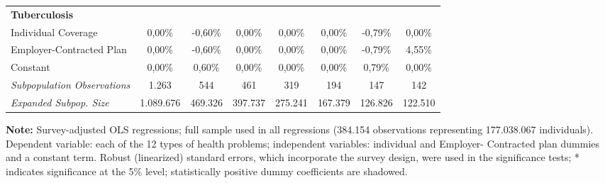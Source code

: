 \documentclass{article}
\begin{document}
\begin{table*}
{\begin{tabular}{l*{7}{c}}
\midrule
\textbf{Tuberculosis} & & & & & & & \\

Individual Coverage 	&   0,00\%         &  -0,60\%         &   0,00\%         &   0,00\%         &   0,00\%         &  -0,79\%         &   0,00\%         \\
Employer-Contracted Plan&   0,00\%         &  -0,60\%         &   0,00\%         &   0,00\%         &   0,00\%         &  -0,79\%         &   4,55\%         \\
Constant            	&   0,00\%         &   0,60\%         &   0,00\%         &   0,00\%         &   0,00\%         &   0,79\%         &   0,00\%         \\

\midrule

\textit{Subpopulation Observations} 	&  1.263 & 544 & 461 & 319 & 194 & 147 & 142         \\
\textit{Expanded Subpop. Size} 		&  1.089.676 & 469.326 & 397.737 & 275.241 & 167.379 & 126.826 & 122.510      \\

	\hline \hline

\end{tabular}}

\justify \small {} \textbf{Note:} Survey-adjusted OLS regressions; full sample used in all regressions (384.154 observations representing 177.038.067
individuals). Dependent variable: each of the 12 types of health problems; independent variables: individual and Employer-
Contracted plan dummies and a constant term. Robust (linearized) standard errors, which incorporate the survey design, were
used in the significance tests; * indicates significance at the 5\% level; statistically positive dummy coefficients are shadowed.

\end{table*}



















\newpage
\end{document}
